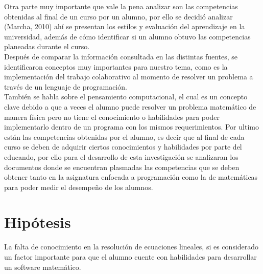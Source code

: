 \documentclass[12pt] {report}
\begin{document}
Otra parte muy importante que vale la pena analizar son las competencias obtenidas al final de un curso por un alumno, por ello se decidió analizar (Marcha, 2010) ahí se presentan los estilos y evaluación del aprendizaje en la universidad, además de cómo identificar si un alumno obtuvo las competencias planeadas durante el curso.\\    
Después de comparar la información consultada en las distintas fuentes, se identificaron conceptos muy importantes para nuestro tema, como es la implementación del trabajo colaborativo al momento de resolver un problema a través de un lenguaje de programación.\\
También se habla sobre el pensamiento computacional, el cual es un concepto clave debido a que a veces el alumno puede resolver un  problema matemático de manera física pero no tiene el conocimiento o habilidades para poder implementarlo dentro de un programa con los mismos requerimientos.
Por ultimo están las competencias obtenidas por el alumno, es decir que al final de cada curso se deben de adquirir ciertos conocimientos y habilidades por parte del educando, por ello para el desarrollo de esta investigación se analizaran los documentos donde se encuentran plasmadas las competencias que se deben obtener tanto en la asignatura enfocada a programación como la de matemáticas para poder medir el desempeño de los alumnos.\\

  
\section{Hipótesis }
La falta de conocimiento en la resolución de ecuaciones lineales, si es considerado un factor importante para que el alumno cuente con habilidades para desarrollar un software matemático.\\
\end{document}
